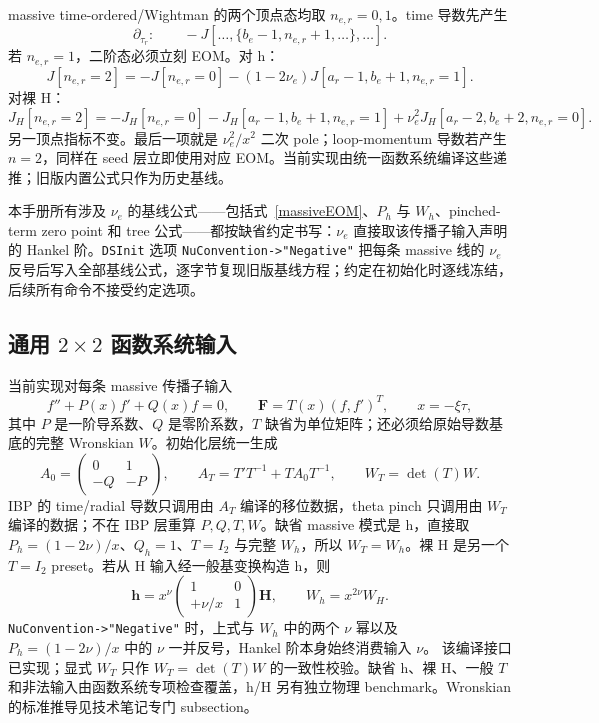 ﻿\documentclass[a4paper,11pt]{article}
\begin{document}
massive time-ordered/Wightman 的两个顶点态均取 $n_{e,r}=0,1$。time 导数先产生
\begin{equation}
 \partial_{\tau_r}:\qquad
 -J[\ldots,\{b_e-1,n_{e,r}+1,\ldots\},\ldots].
\end{equation}
若 $n_{e,r}=1$，二阶态必须立刻 EOM。对 h：
\begin{equation}
 J[n_{e,r}=2]
 =-J[n_{e,r}=0]
  -(1-2\nu_e)J[a_r-1,b_e+1,n_{e,r}=1].
 \label{massiveEOM}
\end{equation}
对裸 H：
\begin{equation}
 J_H[n_{e,r}=2]
 =-J_H[n_{e,r}=0]
  -J_H[a_r-1,b_e+1,n_{e,r}=1]
  +\nu_e^2J_H[a_r-2,b_e+2,n_{e,r}=0].
 \label{bareHEOM}
\end{equation}
另一顶点指标不变。最后一项就是 $\nu_e^2/x^2$ 二次 pole；loop-momentum 导数若产生 $n=2$，同样在 seed 层立即使用对应 EOM。当前实现由统一函数系统编译这些递推；旧版内置公式只作为历史基线。

本手册所有涉及 $\nu_e$ 的基线公式——包括式~\eqref{massiveEOM}、$P_h$ 与 $W_h$、pinched-term zero point 和 tree 公式——都按缺省约定书写：$\nu_e$ 直接取该传播子输入声明的 Hankel 阶。\texttt{DSInit} 选项 \texttt{NuConvention->"Negative"} 把每条 massive 线的 $\nu_e$ 反号后写入全部基线公式，逐字节复现旧版基线方程；约定在初始化时逐线冻结，后续所有命令不接受约定选项。

\subsection{通用 $2\times2$ 函数系统输入}

当前实现对每条 massive 传播子输入
\begin{equation}
 f''+P(x)f'+Q(x)f=0,
 \qquad \mathbf F=T(x)(f,f')^T,
 \qquad x=-\xi\tau,
\end{equation}
其中 $P$ 是一阶导系数、$Q$ 是零阶系数，$T$ 缺省为单位矩阵；还必须给原始导数基底的完整 Wronskian $W$。初始化层统一生成
\begin{equation}
 A_0=\begin{pmatrix}0&1\\-Q&-P\end{pmatrix},
 \qquad
 A_T=T'T^{-1}+TA_0T^{-1},
 \qquad
 W_T=\det(T)W.
\end{equation}
IBP 的 time/radial 导数只调用由 $A_T$ 编译的移位数据，theta pinch 只调用由 $W_T$ 编译的数据；不在 IBP 层重算 $P,Q,T,W$。缺省 massive 模式是 h，直接取 $P_h=(1-2\nu)/x$、$Q_h=1$、$T=I_2$ 与完整 $W_h$，所以 $W_T=W_h$。裸 H 是另一个 $T=I_2$ preset。若从 H 输入经一般基变换构造 h，则
\begin{equation}
 \mathbf h=x^{\nu}\begin{pmatrix}1&0\\+\nu/x&1\end{pmatrix}\mathbf H,
 \qquad W_h=x^{2\nu}W_H.
\end{equation}
\texttt{NuConvention->"Negative"} 时，上式与 $W_h$ 中的两个 $\nu$ 幂以及 $P_h=(1-2\nu)/x$ 中的 $\nu$ 一并反号，Hankel 阶本身始终消费输入 $\nu$。
该编译接口已实现；显式 $W_T$ 只作 $W_T=\det(T)W$ 的一致性校验。缺省 h、裸 H、一般 $T$ 和非法输入由函数系统专项检查覆盖，h/H 另有独立物理 benchmark。Wronskian 的标准推导见技术笔记专门 subsection。
\end{document}
